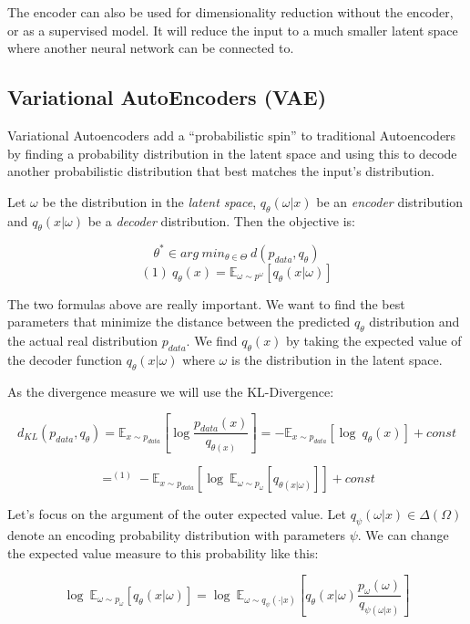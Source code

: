 \documentclass{article}
\begin{document}
The encoder can also be used for dimensionality reduction without the
encoder, or as a supervised model. It will reduce the input to a much
smaller latent space where another neural network can be connected to.

\subsection{Variational AutoEncoders
(VAE)}\label{variational-autoencoders-vae}

Variational Autoencoders add a ``probabilistic spin'' to traditional
Autoencoders by finding a probability distribution in the latent space
and using this to decode another probabilistic distribution that best
matches the input's distribution.

Let \(\omega\) be the distribution in the \emph{latent space},
\(q_\theta(\omega|x)\) be an \emph{encoder} distribution and
\(q_\theta(x|\omega)\) be a \emph{decoder} distribution. Then the
objective is:

\[\theta^* \in arg\ min_{\theta \in \Theta}\ d(p_{data}, q_{\theta})\]
\[(1)\ q_\theta (x)=\mathbb{E}_{\omega \sim p^{\omega}}[q_\theta (x|\omega)]\]

The two formulas above are really important. We want to find the best
parameters that minimize the distance between the predicted \(q_\theta\)
distribution and the actual real distribution \(p_{data}\). We find
\(q_\theta(x)\) by taking the expected value of the decoder function
\(q_\theta(x|\omega)\) where \(\omega\) is the distribution in the
latent space.

As the divergence measure we will use the KL-Divergence:

\[d_{KL}(p_{data}, q_{\theta})=\mathbb{E}_{x\sim p_{data}}[\log \frac{p_{data}(x)}{q_{\theta (x)}}]=-\mathbb{E}_{x\sim p_{data}}[\log\ q_{\theta}(x)]+const\]

\[=^{(1)} -\mathbb{E}_{x\sim p_{data}}[\log\ \mathbb{E}_{\omega \sim p_{\omega}}[q_{\theta (x|\omega)}]]+const\]

Let's focus on the argument of the outer expected value. Let
\(q_\psi(\omega | x)\in \Delta (\Omega)\) denote an encoding probability
distribution with parameters \(\psi\). We can change the expected value
measure to this probability like this:

\[\log\ \mathbb{E}_{\omega \sim p_{\omega}}[q_{\theta} (x|\omega)]=\log\ \mathbb{E}_{\omega \sim q_\psi (\cdot|x)}[q_{\theta} (x|\omega)\frac{p_{\omega}(\omega)}{q_{\psi (\omega | x)}}]\]
\end{document}

